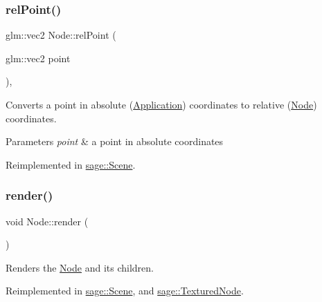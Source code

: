 \subsubsection{\texorpdfstring{relPoint()}{relPoint()}}
{\footnotesize\ttfamily glm\+::vec2 Node\+::rel\+Point (\begin{DoxyParamCaption}\item[{glm\+::vec2}]{point }\end{DoxyParamCaption})\hspace{0.3cm}{\ttfamily [protected]}, {\ttfamily [virtual]}}



Converts a point in absolute (\mbox{\hyperlink{classsage_1_1Application}{Application}}) coordinates to relative (\mbox{\hyperlink{classsage_1_1Node}{Node}}) coordinates. 


\begin{DoxyParams}{Parameters}
{\em point} & a point in absolute coordinates \\
\hline
\end{DoxyParams}


Reimplemented in \mbox{\hyperlink{classsage_1_1Scene_aa8b5a43db8e18dc3ec8695ca465a1308}{sage\+::\+Scene}}.

\mbox{\label{classsage_1_1Node_ab93a6f41e02422a21c44227c0355382a}} 
\subsubsection{\texorpdfstring{render()}{render()}}
{\footnotesize\ttfamily void Node\+::render (\begin{DoxyParamCaption}{ }\end{DoxyParamCaption})\hspace{0.3cm}{\ttfamily [virtual]}}



Renders the \mbox{\hyperlink{classsage_1_1Node}{Node}} and its children. 



Reimplemented in \mbox{\hyperlink{classsage_1_1Scene_a5179bf540ba57931b65668b5b42af10f}{sage\+::\+Scene}}, and \mbox{\hyperlink{classsage_1_1TexturedNode_a17465d5cb984880866f90145bb93d928}{sage\+::\+Textured\+Node}}.

\mbox{\label{classsage_1_1Node_a8813a645a74f6ab59b25d434e65035c6}} 
